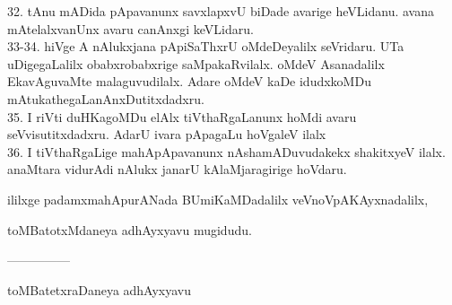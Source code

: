 \documentclass{article}
\begin{document}
32. tAnu mADida pApavanunx savxlapxvU biDade avarige heVLidanu. avana mAtelalxvanUnx avaru canAnxgi keVLidaru.\\
33-34. hiVge A nAlukxjana pApiSaThxrU oMdeDeyalilx seVridaru. UTa uDigegaLalilx obabxrobabxrige saMpakaRvilalx. oMdeV Asanadalilx EkavAguvaMte malaguvudilalx. Adare oMdeV kaDe idudxkoMDu mAtukathegaLanAnxDutitxdadxru.\\
35. I riVti duHKagoMDu elAlx tiVthaRgaLanunx hoMdi avaru seVvisutitxdadxru. AdarU ivara pApagaLu hoVgaleV ilalx\\
36. I tiVthaRgaLige mahApApavanunx nAshamADuvudakekx shakitxyeV ilalx. anaMtara vidurAdi nAlukx janarU kAlaMjaragirige hoVdaru.

\begin{center}
ililxge padamxmahApurANada BUmiKaMDadalilx veVnoVpAKAyxnadalilx,
\end{center}

\begin{center}
toMBatotxMdaneya adhAyxyavu mugidudu.
\end{center}

\begin{center}
---------------
\end{center}

\begin{center}
toMBatetxraDaneya adhAyxyavu
\end{center}
\end{document}
